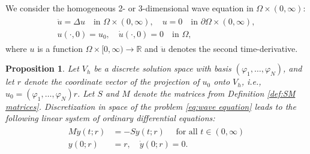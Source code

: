 \documentclass[a4paper,11pt,bibliography=totoc,listof=totoc,headinclude=true,cleardoublepage=empty,oneside]{scrbook}
\newtheorem{prop}[theorem]{Proposition}
\newcommand{\R}{\mathbb{R}}
\begin{document}
We consider the homogeneous 2- or 3-dimensional wave equation in $\Omega \times (0, \infty)$:
\begin{align}
\begin{split}\label{eq:wave equation}
    \ddot{u} = \Delta u \quad \text{in } \Omega \times (0, \infty), \quad  u = 0 \quad \text{in } \partial\Omega\times (0, \infty),\\
    u( \cdot, 0)= u_0, \quad \dot{u}(\cdot, 0) = 0 \quad \text{in } \Omega,
\end{split}
\end{align}
where $u$ is a function $\Omega \times [0, \infty) \rightarrow \R$ and $\ddot{u}$ denotes the second time-derivative.

\begin{prop}
    Let $V_h$ be a discrete solution space with basis $(\varphi_1, \dots, \varphi_N)$, and let $r$ denote the coordinate vector of the projection of $u_0$ onto $V_h$, i.e., $u_0 = (\varphi_1, \dots, \varphi_N)r$. Let $S$ and $M$ denote the matrices from Definition \ref{def:SM matrices}. Discretization in space of the problem \eqref{eq:wave equation} leads to the following linear system of ordinary differential equations:
    \begin{align}\label{eq:discr wave equation}
    \begin{split}
        M \ddot{y}(t; r) &= -S y (t; r) \quad \text{ for all } t \in (0, \infty) \\
        y(0; r) &= r, \quad \dot{y}(0; r) = 0. 
    \end{split}
    \end{align}
\end{prop}
\end{document}
